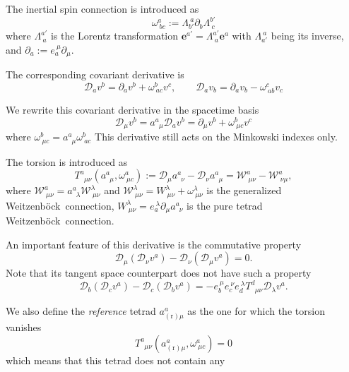 \documentclass[
10pt, %
a4paper, %
oneside, %
headinclude,footinclude, %
BCOR5mm, %
]{scrartcl}
\newcommand{\pd}{\partial}
\newcommand{\itetr}[2]{e^{\ #1}_{#2}}
\newcommand{\tetr}[2]{a^{#1}_{\phantom{#1}#2}}
\newcommand{\rtetr}[2]{a^{#1}_{(\text{r}) #2}}
\newcommand{\spin}[2]{\omega^{#1}_{\ #2}}
\newcommand{\Lor}[2]{\Lambda^{#1'}_{\ #2}}
\newcommand{\iLor}[2]{\Lambda^{\ #1}_{#2'}}
\newcommand{\D}[1]{\mathcal{D}_{#1}} %
\newcommand{\Tors}[2]{T^{#1}_{\phantom{a}#2}}
\newcommand{\W}[2]{\mathcal{W}^{#1}_{\ #2}}
\newcommand{\w}[2]{W^{#1}_{\ #2}}
\newcommand{\We}{Weitzenb\"ock}
\begin{document}
The inertial spin connection is introduced as
\begin{equation}
\spin{a}{bc} := \iLor{a}{b}\pd_b\Lor{b}{c}
\end{equation}
where $ \Lor{a}{a} $ is the Lorentz transformation $ \bm{e}^{a'} = \Lor{a}{a} \bm{e}^a $ with $ 
\iLor{a}{a} $ being its inverse, and $ \pd_a := \itetr{\mu}{a} \pd_\mu $.

The corresponding covariant derivative is 
\begin{equation}
\D{a} v^b = \pd_a v^b + \spin{b}{ac} v^c, \qquad \D{a} v_b = \pd_a v_b - \spin{c}{ab} v_c
\end{equation}

We rewrite this covariant derivative in the spacetime basis
\begin{equation}
\D{\mu} v^b = \tetr{a}{\mu} \D{a} v^b = \pd_\mu v^b + \spin{b}{\mu c} v^c
\end{equation}
where $ \spin{b}{\mu c} = \tetr{a}{\mu}\spin{b}{ac} $
This derivative still acts on the Minkowski indexes only.

The torsion is introduced as
\begin{equation}
\Tors{a}{\mu\nu}(\tetr{a}{\mu},\spin{a}{\mu c}):=\D{\mu}\tetr{a}{\nu} - \D{\nu}\tetr{a}{\mu} = 
\W{a}{\mu\nu} - \W{a}{\nu\mu},
\end{equation}
where $ \W{a}{\mu\nu} = \tetr{a}{\lambda}\W{\lambda}{\mu\nu}$ and $ \W{\lambda}{\mu\nu} = 
\w{\lambda}{\mu\nu} + \spin{\lambda}{\mu\nu}$ is the 
generalized \We\ connection, $ \w{\lambda}{\mu\nu} = \itetr{\lambda}{a}\pd_\mu \tetr{a}{\nu}$ is 
the pure tetrad \We\ connection.


An important feature of this derivative is the commutative property
\begin{equation}
\D{\mu}(\D{\nu} v^a) - \D{\nu}(\D{\mu} v^a) = 0.
\end{equation}
Note that its tangent space counterpart does not have such a property
\begin{equation}
\D{b}(\D{c} v^a) - \D{c}(\D{b} v^a) = 
-\itetr{\mu}{b}\itetr{\nu}{c}\itetr{\lambda}{d}\Tors{d}{\mu\nu}\D{\lambda}v^a .
\end{equation}

We also define the \textit{reference} tetrad $ \rtetr{a}{\mu} $ as the one for which the torsion 
vanishes
\begin{equation}
\Tors{a}{\mu\nu}(\rtetr{a}{\mu},\spin{a}{\mu c}) = 0
\end{equation}
which means that this tetrad does not contain any 
\end{document}
